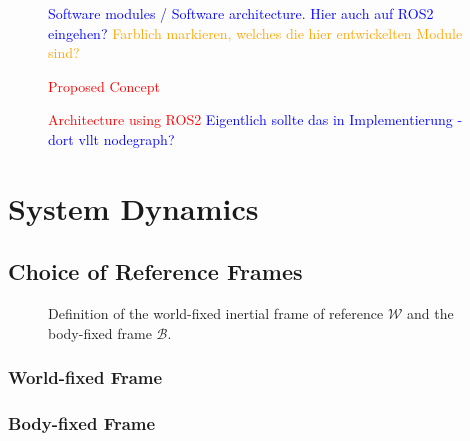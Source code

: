\begin{figure}
\begin{tikzpicture}

	\end{tikzpicture}
	\caption{\textcolor{blue}{Software modules / Software architecture. Hier auch auf ROS2 eingehen?} \textcolor{orange}{Farblich markieren, welches die hier entwickelten Module sind? }}
	\label{fig:software_modules}
\end{figure}


\begin{figure}[tb]
    \centering
    \caption{\textcolor{red}{Proposed Concept}}
    \label{fig:my_label}
\end{figure}
\begin{figure}[tb]
    \centering
    \caption{\textcolor{red}{Architecture using ROS2 \textcolor{blue}{Eigentlich sollte das in Implementierung - dort vllt nodegraph?}}}
    \label{fig:my_label1}
\end{figure}

\section{System Dynamics}
\label{sec:system-dynamics}

\subsection{Choice of Reference Frames}
\begin{figure}[h!]
	\centering
	
	\caption{Definition of the world-fixed inertial frame of reference $\mathcal{W}$ and the body-fixed frame $\mathcal{B}$.}
\end{figure}
\subsubsection{World-fixed Frame}
\subsubsection{Body-fixed Frame}



